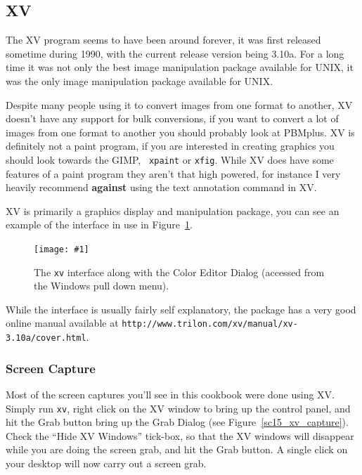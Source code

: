 \documentclass[twoside,11pt]{article}
\newcommand{\htmladdnormallink}[2]{#1}
\newcommand{\htmladdimg}[1]{}
\newcommand{\htmlref}[2]{#1}
\newcommand{\latex}[1]{#1}
\newcommand{\xlabel}[1]{}
\newcommand{\myfig}[5]{
  \begin{figure}
    \centering\texttt{[image: \#1]}
    \typeout{#1 inserted on page \arabic{page}}
    \caption{\label{#4}#5}
  \end{figure}
  }
\newcommand{\myfig}[5]{
    \label{#4} \htmladdimg{#3}\\
    Figure: #5\\
  }
\begin{document}

\subsection{\xlabel{sc15_xv}XV\label{sc15_xv}}

The \htmladdnormallink{XV}{http://www.trilon.com/xv/} program seems to
have been around forever, it was first released sometime during 1990,
with the current release version being 3.10a. For a long time it was
not only the best image manipulation package available for UNIX, it
was the only image manipulation package available for UNIX.

Despite many people using it to convert images from one format to
another, XV doesn't have any support for bulk conversions, if you want
to convert a lot of images from one format to another you should
probably look at \htmlref{PBMplus}{sc15_pbmplus}. XV is definitely not
a paint program, if you are interested in creating graphics you should
look towards the \htmlref{GIMP}{sc15_gimp}, \htmlref{{\tt
xpaint}}{sc15_xpaint} or \htmlref{{\tt xfig}}{sc15_xfig}. While XV
does have some features of a paint program they aren't that high
powered, for instance I very heavily recommend {\bf against} using the
text annotation command in XV.

XV is primarily a graphics display and manipulation package, you can
see an example of the interface in use in
Figure~\ref{sc15_xv_interface}.

\myfig{sc15_xv.eps}{height=0.8\textheight}{sc15_xv.gif}{sc15_xv_interface}{The
{\tt xv} interface along with the Color Editor Dialog (accessed from
the Windows pull down menu).}

While the interface is usually fairly self explanatory, the package
has a very good online
\htmladdnormallink{manual}{http://www.trilon.com/xv/manual/xv-3.10a/cover.html}\latex{
available at {\tt http://www.trilon.com/xv/manual/xv-3.10a/cover.html}}.

\subsubsection{Screen Capture}

Most of the screen captures you'll see in this cookbook were done
using XV. Simply run {\tt xv}, right click on the XV window to bring
up the control panel, and hit the {\sc Grab} button bring up the Grab
Dialog (see Figure~\ref{sc15_xv_capture}). Check the ``Hide XV
Windows'' tick-box, so that the XV windows will disappear while you
are doing the screen grab, and hit the {\sc Grab} button. A single
click on your desktop will now carry out a screen grab.
\end{document}
